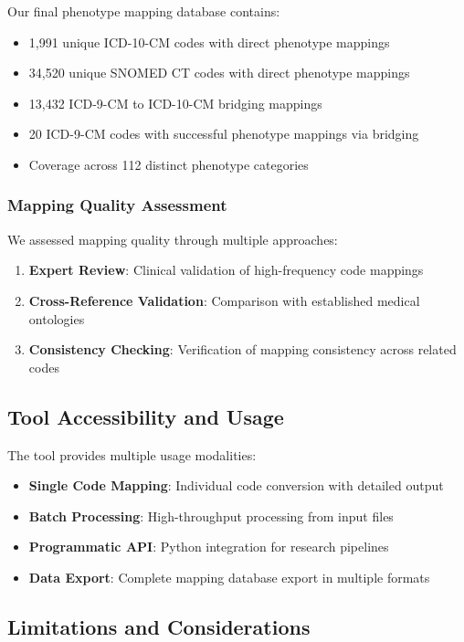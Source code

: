 \documentclass[11pt]{article}
\begin{document}
Our final phenotype mapping database contains:
\begin{itemize}
    \item 1,991 unique ICD-10-CM codes with direct phenotype mappings
    \item 34,520 unique SNOMED CT codes with direct phenotype mappings
    \item 13,432 ICD-9-CM to ICD-10-CM bridging mappings
    \item 20 ICD-9-CM codes with successful phenotype mappings via bridging
    \item Coverage across 112 distinct phenotype categories
\end{itemize}

\subsubsection{Mapping Quality Assessment}

We assessed mapping quality through multiple approaches:
\begin{enumerate}
    \item \textbf{Expert Review}: Clinical validation of high-frequency code mappings
    \item \textbf{Cross-Reference Validation}: Comparison with established medical ontologies
    \item \textbf{Consistency Checking}: Verification of mapping consistency across related codes
\end{enumerate}

\subsection{Tool Accessibility and Usage}

The tool provides multiple usage modalities:
\begin{itemize}
    \item \textbf{Single Code Mapping}: Individual code conversion with detailed output
    \item \textbf{Batch Processing}: High-throughput processing from input files
    \item \textbf{Programmatic API}: Python integration for research pipelines
    \item \textbf{Data Export}: Complete mapping database export in multiple formats
\end{itemize}

\subsection{Limitations and Considerations}
\end{document}
